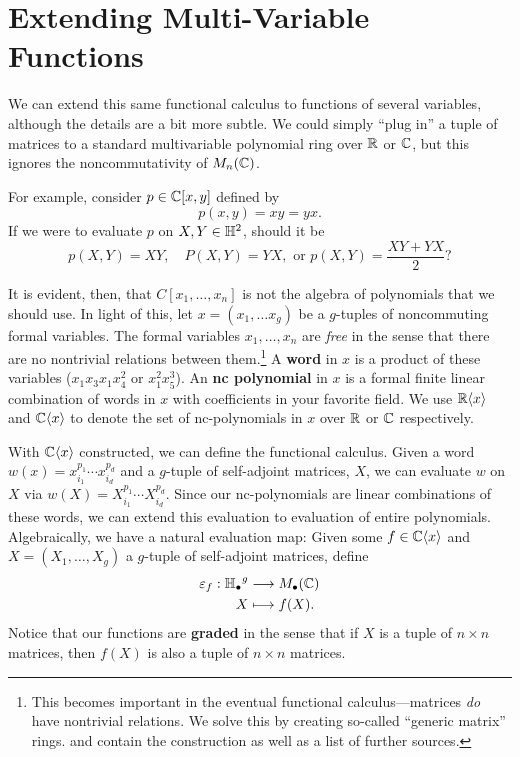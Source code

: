 \section{Extending Multi-Variable Functions}%
\label{sec:ExtMuliVarFun}

We can extend this same functional calculus to functions of several variables,
although the details are a bit more subtle. We could simply ``plug in'' a tuple
of matrices to a standard multivariable polynomial ring over \(\mathbb{R} \) or
\(\mathbb{C} \), but this ignores the noncommutativity of \(M_n(\mathbb{C})\).

For example, consider \(p \in \mathbb{C} [x,y]\) defined by
\[
  p(x,y) = xy = yx.
\]
If we were to evaluate \(p\) on \(X,Y \in \mathbb{H}^2\), should it be
\[
  p(X,Y) = XY, \quad P(X,Y)=YX, \textrm{ or } p(X,Y) = \frac{XY+YX}{2}?
\]

It is evident, then, that \(C[x_1, \dots,x_n]\) is not the algebra of
polynomials that we should use.
In light of this,
let \(x = (x_1 , \dots x_g)\) be a
\(g\)-tuples of noncommuting formal variables. The formal variables
\(x_1, \dots , x_n\) are \emph{free} in the sense that there are no nontrivial
relations between them.\footnote{This becomes important in the eventual
  functional calculus---matrices \emph{do} have nontrivial relations. We solve
  this by creating so-called ``generic matrix'' rings. \cite{klepPositive2018}
  and \cite{klepTracepositive2011}
  contain the construction as well as a list of further sources.}
A \textbf{word} in \(x\) is a product of these
variables (\eg \(x_1x_3x_1x_4^2\) or \(x_1^2x_5^3\)). An \textbf{nc polynomial}
in \(x\) is a formal finite linear combination of words in \(x\) with
coefficients in your favorite field. We use \(\mathbb{R} \langle x \rangle\) and
\(\mathbb{C} \langle x \rangle\) to denote the set of nc-polynomials in \(x\) over
\(\mathbb{R} \) or \(\mathbb{C} \) respectively.

With \(\mathbb{C} \langle x \rangle \) constructed, we can define the functional
calculus. Given a word \(w(x) = x_{i_1}^{p_1}\cdots x_{i_d}^{p_d}\) and a
\(g\)-tuple of self-adjoint matrices, \(X\), we can evaluate \(w\) on \(X\) via
\(w(X) = X_{i_1}^{p_1}\cdots X_{i_d}^{p_d}\). Since our nc-polynomials are
linear combinations of these words, we can extend this evaluation to evaluation
of entire polynomials. Algebraically, we have a natural evaluation map:
Given some \(f \in \mathbb{C} \langle x \rangle \) and
\(X = \left( X_1, \dots ,X_g \right) \) a
\(g\)-tuple of self-adjoint matrices, define
\begin{align*}
  \varepsilon_f: {\mathbb{H}_\bullet}^g &\longrightarrow M_\bullet(\mathbb{C}) \\
             X &\longmapsto f(X)
.\end{align*}
Notice that our functions are \textbf{graded} in the sense that if \(X\) is a
tuple of \(n \times n\) matrices, then \(f(X)\) is also a tuple of
\(n \times n\) matrices.

